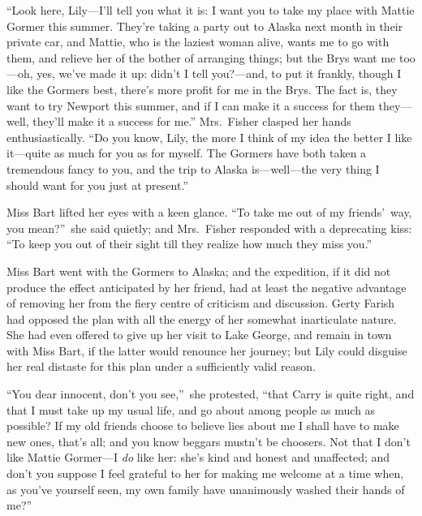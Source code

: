 \documentclass[12pt,a4paper]{book}
\begin{document}
``Look here, Lily---I'll tell you what it is: I want you to take my
place with Mattie Gormer this summer. They're taking a party out
to Alaska next month in their private car, and Mattie, who is the
laziest woman alive, wants me to go with them, and relieve her of
the bother of arranging things; but the Brys want me too---oh,
yes, we've made it up: didn't I tell you?---and, to put it
frankly, though I like the Gormers best, there's more profit for
me in the Brys. The fact is, they want to try Newport this
summer, and if I can make it a success for them they---well,
they'll make it a success for me.'' Mrs.\ Fisher clasped her hands
enthusiastically. ``Do you know, Lily, the more I think of my idea
the better I like it---quite as much for you as for myself. The
Gormers have both taken a tremendous fancy to you, and the trip
to Alaska is---well---the very thing I should want for you just at
present.''





Miss Bart lifted her eyes with a keen glance. ``To take me out of
my friends'\ way, you mean?''\ she said quietly; and Mrs.\ Fisher
responded with a deprecating kiss: ``To keep you out of their
sight till they realize how much they miss you.''







Miss Bart went with the Gormers to Alaska; and the expedition, if
it did not produce the effect anticipated by her friend, had at
least the negative advantage of removing her from the fiery
centre of criticism and discussion. Gerty Farish had opposed the
plan with all the energy of her somewhat inarticulate nature. She
had even offered to give up her visit to Lake George, and remain
in town with Miss Bart, if the latter would renounce her journey;
but Lily could disguise her real distaste for this plan under a
sufficiently valid reason.





``You dear innocent, don't you see,''\ she protested, ``that Carry is
quite right, and that I must take up my usual life, and go about
among people as much as possible? If my old friends choose to
believe lies about me I shall have to make new ones, that's all;
and you know beggars mustn't be choosers. Not that I don't like
Mattie Gormer---I \textit{do} like her: she's kind and honest and
unaffected; and don't you suppose I feel grateful to her for
making me welcome at a time when, as you've yourself seen, my own
family have unanimously washed their hands of me?''
\end{document}
